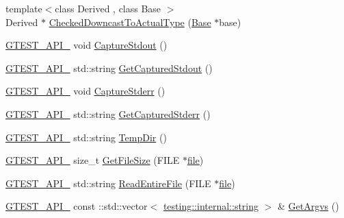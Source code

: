\begin{DoxyCompactItemize}
\item 
{\footnotesize template$<$class Derived , class Base $>$ }\\Derived $\ast$ \hyperlink{namespacetesting_1_1internal_abfe9bfb020d38aa4e0e12c001911b22b}{Checked\+Downcast\+To\+Actual\+Type} (\hyperlink{class_base}{Base} $\ast$base)
\item 
\hyperlink{gtest-port_8h_aa73be6f0ba4a7456180a94904ce17790}{G\+T\+E\+S\+T\+\_\+\+A\+P\+I\+\_\+} void \hyperlink{namespacetesting_1_1internal_acba06d4f0343dec407738ba5544af990}{Capture\+Stdout} ()
\item 
\hyperlink{gtest-port_8h_aa73be6f0ba4a7456180a94904ce17790}{G\+T\+E\+S\+T\+\_\+\+A\+P\+I\+\_\+} std\+::string \hyperlink{namespacetesting_1_1internal_aed657219a9856a8d249a3230de0c54ce}{Get\+Captured\+Stdout} ()
\item 
\hyperlink{gtest-port_8h_aa73be6f0ba4a7456180a94904ce17790}{G\+T\+E\+S\+T\+\_\+\+A\+P\+I\+\_\+} void \hyperlink{namespacetesting_1_1internal_a8ec00d458d0d442bd64af7b5f9c22dda}{Capture\+Stderr} ()
\item 
\hyperlink{gtest-port_8h_aa73be6f0ba4a7456180a94904ce17790}{G\+T\+E\+S\+T\+\_\+\+A\+P\+I\+\_\+} std\+::string \hyperlink{namespacetesting_1_1internal_a374156401da17704099d0c33fa53adfb}{Get\+Captured\+Stderr} ()
\item 
\hyperlink{gtest-port_8h_aa73be6f0ba4a7456180a94904ce17790}{G\+T\+E\+S\+T\+\_\+\+A\+P\+I\+\_\+} std\+::string \hyperlink{namespacetesting_1_1internal_a59a959f437bd7d515b5c41dcf00229c9}{Temp\+Dir} ()
\item 
\hyperlink{gtest-port_8h_aa73be6f0ba4a7456180a94904ce17790}{G\+T\+E\+S\+T\+\_\+\+A\+P\+I\+\_\+} size\+\_\+t \hyperlink{namespacetesting_1_1internal_a06ca3f65f5e85c9ce7299b9e4cd52408}{Get\+File\+Size} (F\+I\+LE $\ast$\hyperlink{_07copy_08_2_read_camera_model_8m_a151631b2fd2bb776ef06c9f440a7ed74}{file})
\item 
\hyperlink{gtest-port_8h_aa73be6f0ba4a7456180a94904ce17790}{G\+T\+E\+S\+T\+\_\+\+A\+P\+I\+\_\+} std\+::string \hyperlink{namespacetesting_1_1internal_a2cc0be60c54a8701423fe5297e1349ee}{Read\+Entire\+File} (F\+I\+LE $\ast$\hyperlink{_07copy_08_2_read_camera_model_8m_a151631b2fd2bb776ef06c9f440a7ed74}{file})
\item 
\hyperlink{gtest-port_8h_aa73be6f0ba4a7456180a94904ce17790}{G\+T\+E\+S\+T\+\_\+\+A\+P\+I\+\_\+} const \+::std\+::vector$<$ \hyperlink{namespacetesting_1_1internal_a8e8ff5b11e64078831112677156cb111}{testing\+::internal\+::string} $>$ \& \hyperlink{namespacetesting_1_1internal_a344160f771a3b754fa4e54b6e9846b23}{Get\+Argvs} ()

\end{DoxyCompactItemize}
